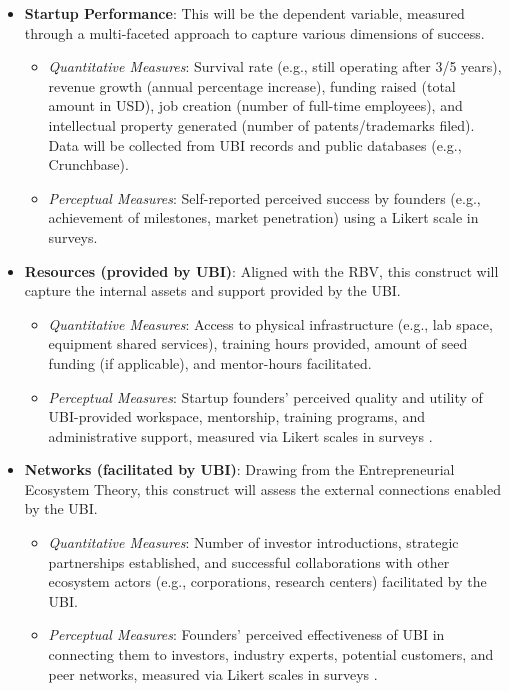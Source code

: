 \documentclass[../Main.tex]{subfiles}
\begin{document}
\begin{itemize}
    \item \textbf{Startup Performance}: This will be the dependent variable, measured through a multi-faceted approach to capture various dimensions of success.
          \begin{itemize}
              \item \textit{Quantitative Measures}: Survival rate (e.g., still operating after 3/5 years), revenue growth (annual percentage increase), funding raised (total amount in USD), job creation (number of full-time employees), and intellectual property generated (number of patents/trademarks filed). Data will be collected from UBI records and public databases (e.g., Crunchbase).
              \item \textit{Perceptual Measures}: Self-reported perceived success by founders (e.g., achievement of milestones, market penetration) using a Likert scale in surveys.
          \end{itemize}
    \item \textbf{Resources (provided by UBI)}: Aligned with the RBV, this construct will capture the internal assets and support provided by the UBI.
          \begin{itemize}
              \item \textit{Quantitative Measures}: Access to physical infrastructure (e.g., lab space, equipment shared services), training hours provided, amount of seed funding (if applicable), and mentor-hours facilitated.
              \item \textit{Perceptual Measures}: Startup founders' perceived quality and utility of UBI-provided workspace, mentorship, training programs, and administrative support, measured via Likert scales in surveys \cite{mian1996assessing}.
          \end{itemize}
    \item \textbf{Networks (facilitated by UBI)}: Drawing from the Entrepreneurial Ecosystem Theory, this construct will assess the external connections enabled by the UBI.
          \begin{itemize}
              \item \textit{Quantitative Measures}: Number of investor introductions, strategic partnerships established, and successful collaborations with other ecosystem actors (e.g., corporations, research centers) facilitated by the UBI.
              \item \textit{Perceptual Measures}: Founders' perceived effectiveness of UBI in connecting them to investors, industry experts, potential customers, and peer networks, measured via Likert scales in surveys \cite{theodorakopoulos2014business, harper2018makes}.

\end{itemize}
\end{itemize}
\end{document}
